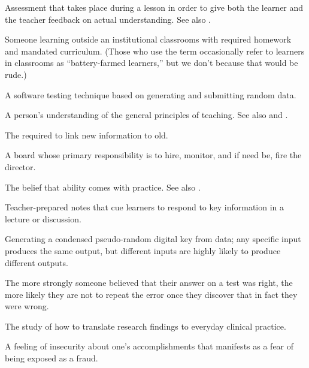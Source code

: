 \begin{description}
 Assessment that takes
place during a lesson in order to give both the learner and the teacher
feedback on actual understanding. See
also .

 Someone learning outside an
institutional classrooms with required homework and mandated curriculum. (Those
who use the term occasionally refer to learners in classrooms as
``battery-farmed learners,'' but we don't because that would be rude.)

 A software testing technique based on
generating and submitting random data.

 A
person's understanding of the general principles of teaching. See also
and .

 The 
required to link new information to old.

 A board whose primary responsibility is
to hire, monitor, and if need be, fire the director.

 The belief that ability comes with
practice. See also .

 Teacher-prepared notes that cue
learners to respond to key information in a lecture or discussion.

 Generating a condensed pseudo-random digital key
from data; any specific input produces the same output, but different inputs are
highly likely to produce different outputs.

 The more strongly someone
believed that their answer on a test was right, the more likely they are not to
repeat the error once they discover that in fact they were wrong.

 The study of how to
translate research findings to everyday clinical practice.

 A feeling of insecurity about
one's accomplishments that manifests as a fear of being exposed as a fraud.


\end{description}
